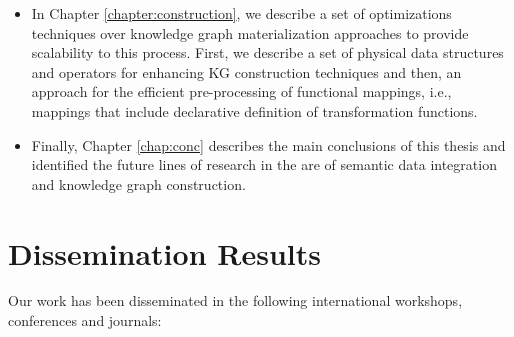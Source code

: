 \begin{itemize}
    \item In Chapter \ref{chapter:construction}, we describe a set of optimizations techniques over knowledge graph materialization approaches to provide scalability to this process. First, we describe a set of physical data structures and operators for enhancing KG construction techniques and then, an approach for the efficient pre-processing of functional mappings, i.e., mappings that include declarative definition of transformation functions.
    \item Finally, Chapter \ref{chap:conc} describes the main conclusions of this thesis and identified the future lines of research in the are of semantic data integration and knowledge graph construction.
\end{itemize}


\section{Dissemination Results}
\label{sec:disresults}

Our work has been disseminated in the following international workshops, conferences and journals:

